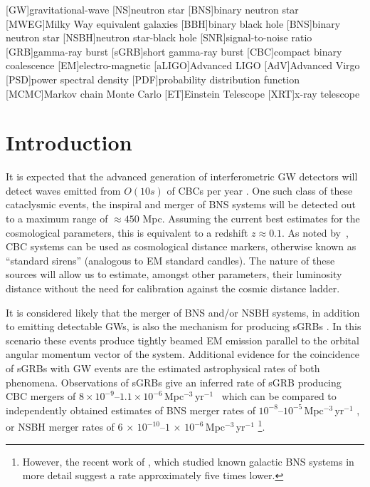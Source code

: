 \documentclass[prd, twocolumn, lengthcheck, superscriptaddress, showpacs, letterpaper, nofootinbib]{revtex4-1}
\newcommand{\refresp}[1]{\textcolor{red}{#1}}
\begin{document}
[GW]{gravitational-wave}
[NS]{neutron star}
[BNS]{binary neutron star}
[MWEG]{Milky Way equivalent galaxies}
[BBH]{binary black hole}
[BNS]{binary neutron star}
[NSBH]{neutron star-black hole}
[SNR]{signal-to-noise ratio}
[GRB]{gamma-ray burst}
[sGRB]{short gamma-ray burst}
[CBC]{compact binary coalescence}
[EM]{electro-magnetic}
[aLIGO]{Advanced LIGO}
[AdV]{Advanced Virgo}
[PSD]{power spectral density}
[PDF]{probability distribution function}
[MCMC]{Markov chain Monte Carlo}
[ET]{Einstein Telescope}
[XRT]{x-ray telescope}

\section{Introduction\label{sec:intro}}

It is expected that the advanced generation of interferometric \ac{GW}
detectors will detect waves emitted from $O(10s)$ of \acp{CBC} per year \refresp{\cite{2010CQGra..27q3001A}}. One
such class of these cataclysmic events, the inspiral and merger of \ac{BNS}
systems will be detected out to a maximum range of $\approx 450$ Mpc. Assuming
the current best estimates for the cosmological parameters, this is equivalent
to a redshift $z\approx 0.1$. As noted by~\citet{1986Natur.323..310S}, \ac{CBC}
systems can be used as cosmological distance markers, otherwise known as
``standard sirens'' (analogous to \ac{EM} standard candles). The nature of
these sources will allow us to estimate, amongst other parameters, their
luminosity distance without the need for calibration against the cosmic
distance ladder.

It is considered likely that the merger of \ac{BNS} and/or \ac{NSBH} systems,
in addition to emitting detectable \acp{GW}, is also the mechanism for
producing \acp{sGRB} \cite{1992ApJ...395L..83N}. In this scenario these events
produce tightly beamed \ac{EM} emission parallel to the orbital angular
momentum vector of the system. Additional evidence for the coincidence
of \acp{sGRB} with \ac{GW} events are the estimated astrophysical rates of both
phenomena. Observations of \acp{sGRB} give an inferred rate of \ac{sGRB}
producing \ac{CBC} mergers of $8\times 10^{-9}$--$1.1\times
10^{-6}$\,Mpc$^{-3}$\,yr$^{-1}$~\cite{2012MNRAS.425.2668C} which can be
compared to independently obtained estimates of \ac{BNS} merger rates of
$10^{-8}$--$10^{-5}$\,Mpc$^{-3}$\,yr$^{-1}$ \cite{2010CQGra..27q3001A}, or
\ac{NSBH} merger rates of
$6\,\times\,10^{-10}$--$1\,\times\,10^{-6}$\,Mpc$^{-3}$\,yr$^{-1}$
\cite{2010CQGra..27q3001A}\footnote{However, the recent work of
\cite{2015MNRAS.448..928K}, which studied known galactic \ac{BNS} systems in
more detail suggest a rate approximately five times lower.}.
  
\end{document}
